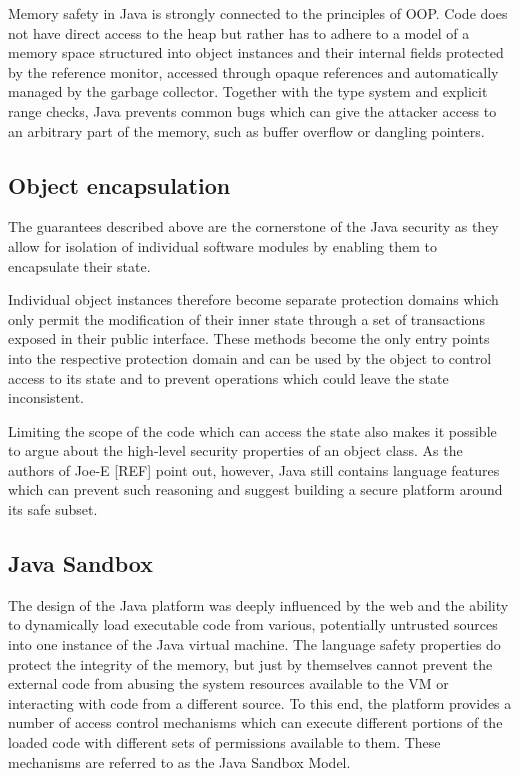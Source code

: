 \documentclass[a4paper,12pt,twoside,openright]{report}
\begin{document}
Memory safety in Java is strongly connected to the principles of OOP. Code does not have direct access to the heap but rather has to adhere to a model of a memory space structured into object instances and their internal fields protected by the reference monitor, accessed through opaque references and automatically managed by the garbage collector. Together with the type system and explicit range checks, Java prevents common bugs which can give the attacker access to an arbitrary part of the memory, such as buffer overflow or dangling pointers.

\subsection{Object encapsulation}

The guarantees described above are the cornerstone of the Java security as they allow for isolation of individual software modules by enabling them to encapsulate their state. 

Individual object instances therefore become separate protection domains which only permit the modification of their inner state through a set of transactions exposed in their public interface. These methods become the only entry points into the respective protection domain and can be used by the object to control access to its state and to prevent operations which could leave the state inconsistent.

Limiting the scope of the code which can access the state also makes it possible to argue about the high-level security properties of an object class. As the authors of Joe-E [REF] point out, however, Java still contains language features which can prevent such reasoning and suggest building a secure platform around its safe subset.

\subsection{Java Sandbox}

The design of the Java platform was deeply influenced by the web and the ability to dynamically load executable code from various, potentially untrusted sources into one instance of the Java virtual machine. The language safety properties do protect the integrity of the memory, but just by themselves cannot prevent the external code from abusing the system resources available to the VM or interacting with code from a different source. To this end, the platform provides a number of access control mechanisms which can execute different portions of the loaded code with different sets of permissions available to them. These mechanisms are referred to as the Java Sandbox Model.
\end{document}
